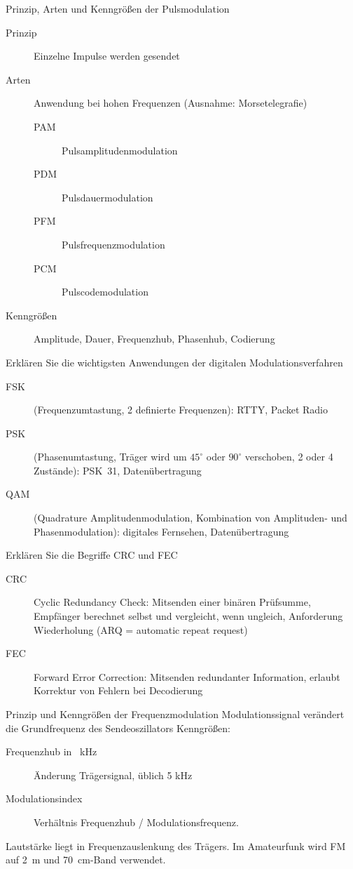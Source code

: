 \documentclass[avery5371,grid,frame,a4paper]{flashcards}
\newcommand{\card}[3]{
  \begin{flashcard}[{\chap} -- #1]{#2}#3\end{flashcard}
}
\begin{document}
\card{46}{Prinzip, Arten und Kenngrößen der Pulsmodulation}{
  \small
  \begin{description}
    \item[Prinzip] Einzelne Impulse werden gesendet
    \item[Arten] Anwendung bei hohen Frequenzen (Ausnahme: Morsetelegrafie)
      \begin{description}
        \item[PAM] Pulsamplitudenmodulation
        \item[PDM] Pulsdauermodulation
        \item[PFM] Pulsfrequenzmodulation
        \item[PCM] Pulscodemodulation
      \end{description}
    \item[Kenngrößen] Amplitude, Dauer, Frequenzhub, Phasenhub, Codierung
  \end{description}
}
\card{47}{Erklären Sie die wichtigsten Anwendungen der digitalen Modulationsverfahren}{
  \begin{description}
    \item[FSK]
      (Frequenzumtastung, 2 definierte Frequenzen):
      RTTY, Packet Radio
    \item[PSK]
      (Phasenumtastung, Träger wird um $45^\circ$ oder $90^\circ$ verschoben, 2 oder 4 Zustände):
      PSK~31, Datenübertragung
    \item[QAM]
      (Quadrature Amplitudenmodulation, Kombination von Amplituden- und Phasenmodulation):
      digitales Fernsehen, Datenübertragung
  \end{description}
}
\card{48}{Erklären Sie die Begriffe CRC und FEC}{
  \begin{description}
    \item[CRC]
      Cyclic Redundancy Check:
      Mitsenden einer binären Prüfsumme,
      Empfänger berechnet selbst und vergleicht,
      wenn ungleich, Anforderung Wiederholung (ARQ = automatic repeat request)
    \item[FEC]
      Forward Error Correction:
      Mitsenden redundanter Information,
      erlaubt Korrektur von Fehlern bei Decodierung
  \end{description}
}
\card{49}{Prinzip und Kenngrößen der Frequenzmodulation}{
  Modulationssignal verändert die Grundfrequenz des Sendeoszillators
  Kenngrößen:
  \begin{description}
    \item[Frequenzhub in \SI{}{\kilo\Hz}] Änderung Trägersignal, üblich 5 kHz
    \item[Modulationsindex] Verhältnis Frequenzhub / Modulationsfrequenz.
  \end{description}
  Lautstärke liegt in Frequenzauslenkung des Trägers.
  Im Amateurfunk wird FM auf \SI{2}{\metre} und \SI{70}{\centi\metre}-Band verwendet.
}
\end{document}
